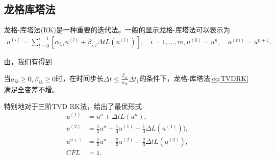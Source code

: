 \subsection{龙格库塔法}
龙格-库塔法(RK)是一种重要的迭代法。一般的显示龙格-库塔法可以表示为
\begin{equation}
    \begin{aligned}
        u^{(i)} = \sum_{l=0}^{i-1}[\alpha_{i,l}u^{(l)} + \beta_{i,l}\Delta tL(u^{(l)})], \quad i = 1,...,m,
        u^{(0)}=u^n,\quad u^{(m)} = u^{n+1}.
    \end{aligned}
    \label{eq:TVDRK}
\end{equation}

由\parencite{shu1998total}，我们有得到
\begin{lemma}
    当$a_{ik} \geq 0, \beta_{ik} \geq 0$时，在时间步长$\Delta t \leq \frac{\beta_{ik}}{\alpha_{ik}} \Delta t_1$的条件下，龙格-库塔法\eqref{eq:TVDRK}满足全变差不增。
\end{lemma}

特别地对于三阶TVD RK法，\parencite{shu1998total}给出了最优形式
\begin{equation}
    \begin{aligned}
        u^{(1)} & = u^n + \Delta t L(u^n),                                                \\
        u^{(2)} & = \frac{1}{2}u^n + \frac{1}{4}u^{(1)} + \frac{1}{4}\Delta L(u^{(1)})),  \\
        u^{n+1} & = \frac{1}{3}u^n + \frac{2}{3}u^{(2)} + \frac{2}{3}\Delta t L(u^{(2)}), \\
        CFL     & = 1.
    \end{aligned}
\end{equation}


